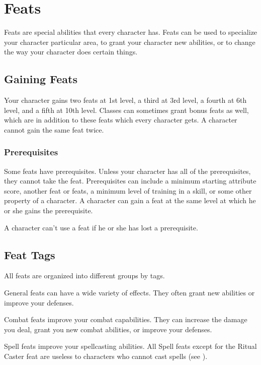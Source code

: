 \chapter{Feats}\label{Feats}

Feats are special abilities that every character has.
Feats can be used to specialize your character particular area, to grant your character new abilities, or to change the way your character does certain things.

\section{Gaining Feats}
    Your character gains two feats at 1st level, a third at 3rd level, a fourth at 6th level, and a fifth at 10th level.
    Classes can sometimes grant bonus feats as well, which are in addition to these feats which every character gets.
    A character cannot gain the same feat twice.

    \subsection{Prerequisites}
        Some feats have prerequisites.
        Unless your character has all of the prerequisites, they cannot take the feat.
        Prerequisites can include a minimum starting attribute score, another feat or feats, a minimum level of training in a skill, or some other property of a character.
        A character can gain a feat at the same level at which he or she gains the prerequisite.

        A character can't use a feat if he or she has lost a prerequisite.

\section{Feat Tags}
    All feats are organized into different groups by tags.

     General feats can have a wide variety of effects.
    They often grant new abilities or improve your defenses.

     Combat feats improve your combat capabilities.
    They can increase the damage you deal, grant you new combat abilities, or improve your defenses.

     Spell feats improve your spellcasting abilities.
    All Spell feats except for the Ritual Caster feat are useless to characters who cannot cast spells (see ).

